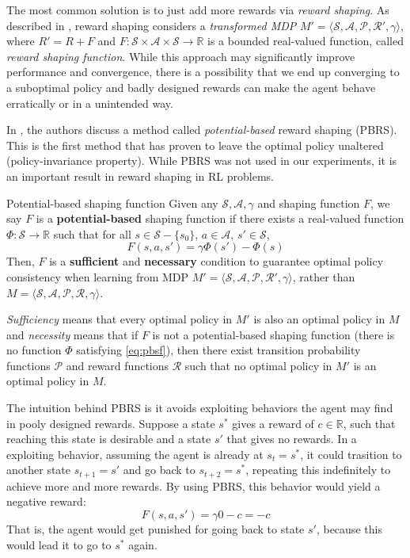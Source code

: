 The most common solution is to just add more rewards via \textit{reward shaping}. As described in \cite{10.5555/645528.657613}, reward shaping considers a \textit{transformed MDP} $M' = \langle \mathcal{S}, \mathcal{A}, \mathcal{P}, \mathcal{R'}, \gamma \rangle$, where $R' = R + F$ and $F \colon \mathcal{S} \times \mathcal{A} \times \mathcal{S} \to \mathbb{R}$ is a bounded real-valued function, called \textit{reward shaping function}. While this approach may significantly improve performance and convergence, there is a possibility that we end up converging to a suboptimal policy and badly designed rewards can make the agent behave erratically or in a unintended way.

In \cite{10.5555/645528.657613}, the authors discuss a method called \textit{potential-based} reward shaping (PBRS). This is the first method that has proven to leave the optimal policy unaltered (policy-invariance property). While PBRS was not used in our experiments, it is an important result in reward shaping in RL problems.

\begin{theorem}{Potential-based shaping function}
      Given any $\mathcal{S}, \mathcal{A}, \gamma$ and shaping function $F$, we say $F$ is a \textbf{potential-based} shaping function if there exists a real-valued function $\Phi \colon \mathcal{S} \to \mathbb{R}$ such that for all $s \in \mathcal{S} - \{s_0\}$, $a \in \mathcal{A}$, $s' \in \mathcal{S}$,
      \begin{equation}\label{eq:pbsf}
            F(s, a, s') = \gamma \Phi(s') - \Phi(s)
      \end{equation}
      Then, $F$ is a \textbf{sufficient} and \textbf{necessary} condition to guarantee optimal policy consistency when learning from MDP $M' = \langle \mathcal{S}, \mathcal{A}, \mathcal{P}, \mathcal{R'}, \gamma \rangle$,  rather than $M = \langle \mathcal{S}, \mathcal{A}, \mathcal{P}, \mathcal{R}, \gamma \rangle$.
\end{theorem}

\textit{Sufficiency} means that every optimal policy in $M'$ is also an optimal policy in $M$ and \textit{necessity} means that if $F$ is not a potential-based shaping function (there is no function $\Phi$ satisfying \ref{eq:pbsf}), then there exist transition probability functions $\mathcal{P}$ and reward functions $\mathcal{R}$ such that no optimal policy in $M'$ is an optimal policy in $M$.

The intuition behind PBRS is it avoids exploiting behaviors the agent may find in pooly designed rewards. Suppose a state $s^*$ gives a reward of $c \in \mathbb{R}$, such that reaching this state is desirable and a state $s'$ that gives no rewards. In a exploiting behavior, assuming the agent is already at $s_t = s^*$, it could trasition to another state $s_{t+1} = s'$ and go back to $s_{t+2} = s^*$, repeating this indefinitely to achieve more and more rewards. By using PBRS, this behavior would yield a negative reward:
\begin{equation}
      F(s, a, s') = \gamma 0 - c = -c
\end{equation}
That is, the agent would get punished for going back to state $s'$, because this would lead it to go to $s^*$ again.